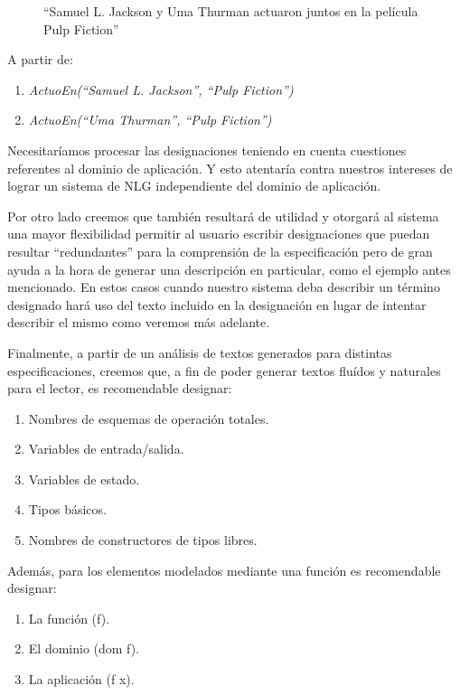 \begin{figure}[H]
\center
``Samuel L. Jackson	 y Uma Thurman actuaron juntos en la película Pulp Fiction''
\end{figure}

\bigskip
\noindent
A partir de:

\begin{enumerate}
\item \emph{ActuoEn(``Samuel L. Jackson'', ``Pulp Fiction'')}
\item \emph{ActuoEn(``Uma Thurman'', ``Pulp Fiction'')}
\end{enumerate}

\bigskip
\noindent
Necesitaríamos procesar las designaciones teniendo en cuenta cuestiones referentes al dominio de aplicación. Y esto atentaría contra nuestros intereses de lograr un sistema de NLG independiente del dominio de aplicación.

Por otro lado creemos que también resultará de utilidad y otorgará al sistema una mayor flexibilidad permitir al usuario escribir designaciones que puedan resultar ``redundantes'' para la comprensión de la especificación pero de gran ayuda a la hora de generar una descripción en particular, como el ejemplo antes mencionado. En estos casos cuando nuestro sistema deba describir un término designado hará uso del texto incluido en la designación en lugar de intentar describir el mismo como veremos más adelante.

\bigskip
Finalmente, a partir de un análisis de textos generados para distintas especificaciones, creemos que, a fin de poder generar textos fluídos y naturales para el lector, es recomendable designar:

\bigskip
\begin{enumerate}
	\item Nombres de esquemas de operación totales.
	\item Variables de entrada/salida.
	\item Variables de estado.
	\item Tipos básicos.
	\item Nombres de constructores de tipos libres.
\end{enumerate}

Además, para los elementos modelados mediante una función es recomendable designar:
\begin{enumerate}
	\item La función (f).
	\item El dominio (dom f).
	\item La aplicación (f x).
\end{enumerate}
